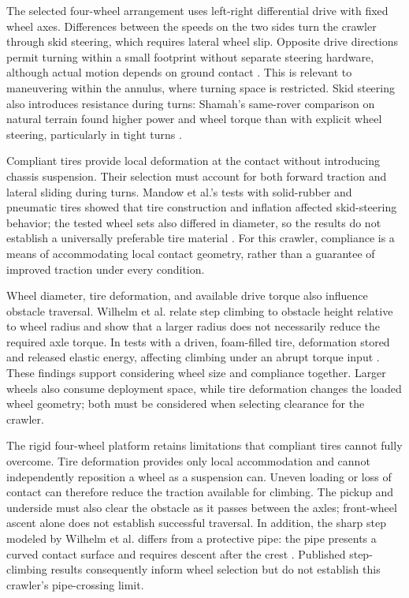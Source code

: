 The selected four-wheel arrangement uses left-right differential drive with fixed wheel axes. Differences between the speeds on the two sides turn the crawler through skid steering, which requires lateral wheel slip. Opposite drive directions permit turning within a small footprint without separate steering hardware, although actual motion depends on ground contact \citep{mandow2007Kinematics}. This is relevant to maneuvering within the annulus, where turning space is restricted. Skid steering also introduces resistance during turns: Shamah's same-rover comparison on natural terrain found higher power and wheel torque than with explicit wheel steering, particularly in tight turns \citep{shamah1999SkidSteering}.

Compliant tires provide local deformation at the contact without introducing chassis suspension. Their selection must account for both forward traction and lateral sliding during turns. Mandow et al.'s tests with solid-rubber and pneumatic tires showed that tire construction and inflation affected skid-steering behavior; the tested wheel sets also differed in diameter, so the results do not establish a universally preferable tire material \citep{mandow2007Kinematics}. For this crawler, compliance is a means of accommodating local contact geometry, rather than a guarantee of improved traction under every condition.

\label{sec:obstacle-traversal-review}
Wheel diameter, tire deformation, and available drive torque also influence obstacle traversal. Wilhelm et al. relate step climbing to obstacle height relative to wheel radius and show that a larger radius does not necessarily reduce the required axle torque. In tests with a driven, foam-filled tire, deformation stored and released elastic energy, affecting climbing under an abrupt torque input \citep{wilhelm2007StepClimbing}. These findings support considering wheel size and compliance together. Larger wheels also consume deployment space, while tire deformation changes the loaded wheel geometry; both must be considered when selecting clearance for the crawler.

The rigid four-wheel platform retains limitations that compliant tires cannot fully overcome. Tire deformation provides only local accommodation and cannot independently reposition a wheel as a suspension can. Uneven loading or loss of contact can therefore reduce the traction available for climbing. The pickup and underside must also clear the obstacle as it passes between the axles; front-wheel ascent alone does not establish successful traversal. In addition, the sharp step modeled by Wilhelm et al. differs from a protective pipe: the pipe presents a curved contact surface and requires descent after the crest \citep{wilhelm2007StepClimbing}. Published step-climbing results consequently inform wheel selection but do not establish this crawler's pipe-crossing limit.

